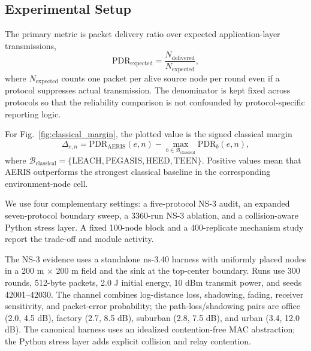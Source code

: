 \documentclass[conference]{IEEEtran}
\begin{document}
\subsection{Experimental Setup}
The primary metric is packet delivery ratio over expected application-layer transmissions,
\begin{equation}
\mathrm{PDR}_{\mathrm{expected}}=\frac{N_{\mathrm{delivered}}}{N_{\mathrm{expected}}},
\end{equation}
where $N_{\mathrm{expected}}$ counts one packet per alive source node per round even if a protocol suppresses actual transmission. The denominator is kept fixed across protocols so that the reliability comparison is not confounded by protocol-specific reporting logic.

For Fig.~\ref{fig:classical_margin}, the plotted value is the signed classical margin
\begin{equation}
\Delta_{e,n}=\mathrm{PDR}_{\mathrm{AERIS}}(e,n)-\max_{b\in\mathcal{B}_{\mathrm{classical}}}\mathrm{PDR}_b(e,n),
\end{equation}
where $\mathcal{B}_{\mathrm{classical}}=\{\mathrm{LEACH},\mathrm{PEGASIS},\mathrm{HEED},\mathrm{TEEN}\}$. Positive values mean that AERIS outperforms the strongest classical baseline in the corresponding environment-node cell.

We use four complementary settings: a five-protocol NS-3 audit, an expanded seven-protocol boundary sweep, a 3360-run NS-3 ablation, and a collision-aware Python stress layer. A fixed 100-node block and a 400-replicate mechanism study report the trade-off and module activity.

The NS-3 evidence uses a standalone ns-3.40 harness with uniformly placed nodes in a 200 m $\times$ 200 m field and the sink at the top-center boundary. Runs use 300 rounds, 512-byte packets, 2.0 J initial energy, 10 dBm transmit power, and seeds 42001--42030. The channel combines log-distance loss, shadowing, fading, receiver sensitivity, and packet-error probability; the path-loss/shadowing pairs are office (2.0, 4.5 dB), factory (2.7, 8.5 dB), suburban (2.8, 7.5 dB), and urban (3.4, 12.0 dB). The canonical harness uses an idealized contention-free MAC abstraction; the Python stress layer adds explicit collision and relay contention.
\end{document}

